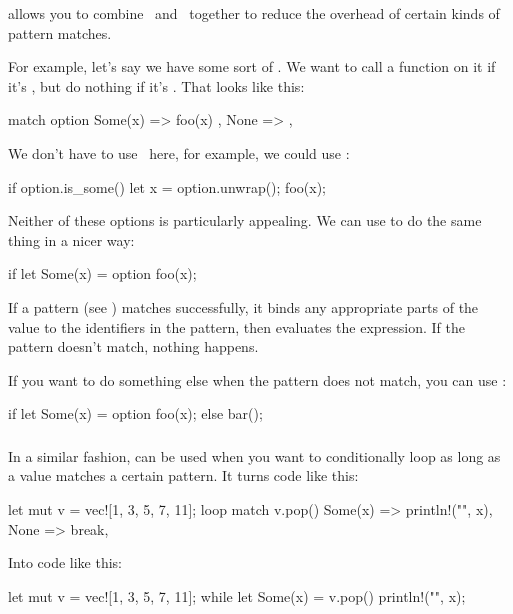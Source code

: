  allows you to combine \keyif\ and \keylet\ together to reduce the overhead of certain kinds of pattern matches.

\blank

For example, let's say we have some sort of . We want to call a function on it if it's , but do nothing if it's 
. That looks like this:

\begin{rustc}
match option {
    Some(x) => { foo(x) },
    None => {},
}
\end{rustc}

We don't have to use \match\ here, for example, we could use \keyif:

\begin{rustc}
if option.is_some() {
    let x = option.unwrap();
    foo(x);
}
\end{rustc}

Neither of these options is particularly appealing. We can use  to do the same thing in a nicer way:

\begin{rustc}
if let Some(x) = option {
    foo(x);
}
\end{rustc}

If a pattern (see ) matches successfully, it binds any appropriate parts of the value to the identifiers in 
the pattern, then evaluates the expression. If the pattern doesn't match, nothing happens.

\blank

If you want to do something else when the pattern does not match, you can use :

\begin{rustc}
if let Some(x) = option {
    foo(x);
} else {
    bar();
}
\end{rustc}

\subsubsection*{}

In a similar fashion,  can be used when you want to conditionally loop as long as a value matches a certain pattern. It 
turns code like this:

\begin{rustc}
let mut v = vec![1, 3, 5, 7, 11];
loop {
    match v.pop() {
        Some(x) =>  println!("{}", x),
        None => break,
    }
}
\end{rustc}

Into code like this:

\begin{rustc}
let mut v = vec![1, 3, 5, 7, 11];
while let Some(x) = v.pop() {
    println!("{}", x);
}
\end{rustc}

